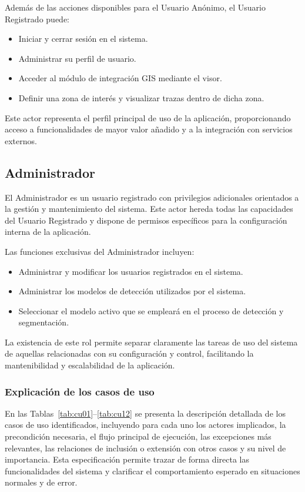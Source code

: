 Además de las acciones disponibles para el Usuario Anónimo, el Usuario Registrado puede:
\begin{itemize}
	\item Iniciar y cerrar sesión en el sistema.
	\item Administrar su perfil de usuario.
	\item Acceder al módulo de integración GIS mediante el visor.
	\item Definir una zona de interés y visualizar trazas dentro de dicha zona.
\end{itemize}

Este actor representa el perfil principal de uso de la aplicación, proporcionando acceso a funcionalidades de mayor valor añadido y a la integración con servicios externos.

\subsection{Administrador}

El Administrador es un usuario registrado con privilegios adicionales orientados a la gestión y mantenimiento del sistema. 
Este actor hereda todas las capacidades del Usuario Registrado y dispone de permisos específicos para la configuración interna de la aplicación.

Las funciones exclusivas del Administrador incluyen:
\begin{itemize}
	\item Administrar y modificar los usuarios registrados en el sistema.
	\item Administrar los modelos de detección utilizados por el sistema.
	\item Seleccionar el modelo activo que se empleará en el proceso de detección y segmentación.
\end{itemize}

La existencia de este rol permite separar claramente las tareas de uso del sistema de aquellas relacionadas con su configuración y control, facilitando la mantenibilidad y escalabilidad de la aplicación.

\subsubsection{Explicación de los casos de uso}

En las Tablas~\ref{tab:cu01}--\ref{tab:cu12} se presenta la descripción detallada de los casos de uso identificados, incluyendo para cada uno los actores implicados, la precondición necesaria, el flujo principal de ejecución, las excepciones más relevantes, las relaciones de inclusión o extensión con otros casos y su nivel de importancia. Esta especificación permite trazar de forma directa las funcionalidades del sistema y clarificar el comportamiento esperado en situaciones normales y de error.

